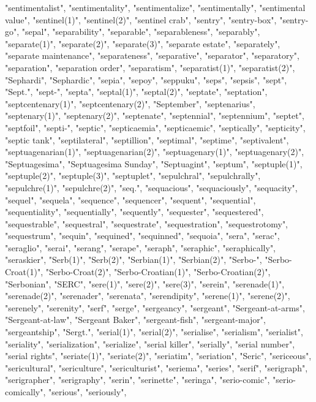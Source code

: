 "sentimentalist",
"sentimentality",
"sentimentalize",
"sentimentally",
"sentimental value",
"sentinel(1)",
"sentinel(2)",
"sentinel crab",
"sentry",
"sentry-box",
"sentry-go",
"sepal",
"separability",
"separable",
"separableness",
"separably",
"separate(1)",
"separate(2)",
"separate(3)",
"separate estate",
"separately",
"separate maintenance",
"separateness",
"separative",
"separator",
"separatory",
"separation",
"separation order",
"separatism",
"separatist(1)",
"separatist(2)",
"Sephardi",
"Sephardic",
"sepia",
"sepoy",
"seppuku",
"seps",
"sepsis",
"sept",
"Sept.",
"sept-",
"septa",
"septal(1)",
"septal(2)",
"septate",
"septation",
"septcentenary(1)",
"septcentenary(2)",
"September",
"septenarius",
"septenary(1)",
"septenary(2)",
"septenate",
"septennial",
"septennium",
"septet",
"septfoil",
"septi-",
"septic",
"septicaemia",
"septicaemic",
"septically",
"septicity",
"septic tank",
"septilateral",
"septillion",
"septimal",
"septime",
"septivalent",
"septuagenarian(1)",
"septuagenarian(2)",
"septuagenary(1)",
"septuagenary(2)",
"Septuagesima",
"Septuagesima Sunday",
"Septuagint",
"septum",
"septuple(1)",
"septuple(2)",
"septuple(3)",
"septuplet",
"sepulchral",
"sepulchrally",
"sepulchre(1)",
"sepulchre(2)",
"seq.",
"sequacious",
"sequaciously",
"sequacity",
"sequel",
"sequela",
"sequence",
"sequencer",
"sequent",
"sequential",
"sequentiality",
"sequentially",
"sequently",
"sequester",
"sequestered",
"sequestrable",
"sequestral",
"sequestrate",
"sequestration",
"sequestrotomy",
"sequestrum",
"sequin",
"sequined",
"sequinned",
"sequoia",
"sera",
"serac",
"seraglio",
"serai",
"serang",
"serape",
"seraph",
"seraphic",
"seraphically",
"seraskier",
"Serb(1)",
"Serb(2)",
"Serbian(1)",
"Serbian(2)",
"Serbo-",
"Serbo-Croat(1)",
"Serbo-Croat(2)",
"Serbo-Croatian(1)",
"Serbo-Croatian(2)",
"Serbonian",
"SERC",
"sere(1)",
"sere(2)",
"sere(3)",
"serein",
"serenade(1)",
"serenade(2)",
"serenader",
"serenata",
"serendipity",
"serene(1)",
"serene(2)",
"serenely",
"serenity",
"serf",
"serge",
"sergeancy",
"sergeant",
"Sergeant-at-arms",
"Sergeant-at-law",
"Sergeant Baker",
"sergeant-fish",
"sergeant-major",
"sergeantship",
"Sergt.",
"serial(1)",
"serial(2)",
"serialise",
"serialism",
"serialist",
"seriality",
"serialization",
"serialize",
"serial killer",
"serially",
"serial number",
"serial rights",
"seriate(1)",
"seriate(2)",
"seriatim",
"seriation",
"Seric",
"sericeous",
"sericultural",
"sericulture",
"sericulturist",
"seriema",
"series",
"serif",
"serigraph",
"serigrapher",
"serigraphy",
"serin",
"serinette",
"seringa",
"serio-comic",
"serio-comically",
"serious",
"seriously",
